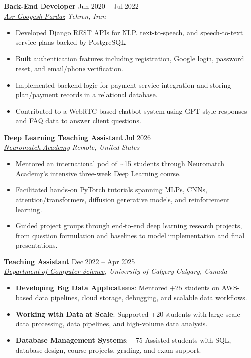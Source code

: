 \documentclass[a4paper,10pt]{article}
\newcommand{\resumeSubheading}[4]{
    \textbf{#1} \hfill #2 \\
    \textit{#3} \hfill \textit{#4}
}
\begin{document}
\resumeSubheading
{Back-End Developer}
{Jun 2020 -- Jul 2022}
{\href{https://asr-gooyesh.com/en/}{Asr Gooyesh Pardaz}}
{Tehran, Iran}
\begin{itemize}[leftmargin=0.25in]
    \item Developed Django REST APIs for NLP, text-to-speech, and speech-to-text service plans backed by PostgreSQL.
    \item Built authentication features including registration, Google login, password reset, and email/phone verification.
    \item Implemented backend logic for payment-service integration and storing plan/payment records in a relational database.
    \item Contributed to a WebRTC-based chatbot system using GPT-style responses and FAQ data to answer client questions.
\end{itemize}

\resumeSubheading
{Deep Learning Teaching Assistant}
{Jul 2026}
{\href{https://neuromatch.io/}{Neuromatch Academy}}
{Remote, United States}
\begin{itemize}[leftmargin=0.25in]
    \item Mentored an international pod of $\sim$15 students through Neuromatch Academy's intensive three-week Deep Learning course.
    \item Facilitated hands-on PyTorch tutorials spanning MLPs, CNNs, attention/transformers, diffusion generative models, and reinforcement learning.
    \item Guided project groups through end-to-end deep learning research projects, from question formulation and baselines to model implementation and final presentations.
\end{itemize}

\resumeSubheading
{Teaching Assistant}
{Dec 2022 -- Apr 2025}
{\href{https://science.ucalgary.ca/computer-science} {Department of Computer Science}, University of Calgary}
{Calgary, Canada}
\begin{itemize}[leftmargin=0.25in]
    \item \textbf{Developing Big Data Applications}: Mentored +25 students on AWS-based data pipelines, cloud storage, debugging, and scalable data workflows. 
    \item \textbf{Working with Data at Scale}: Supported +20 students with large-scale data processing, data pipelines, and high-volume data analysis. 
    \item \textbf{Database Management Systems}: +75 Assisted students with SQL, database design, course projects, grading, and exam support.
\end{itemize}
\end{document}
